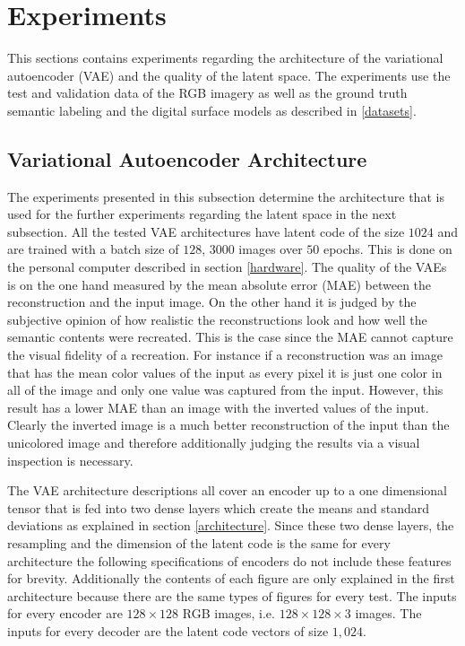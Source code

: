\section{Experiments}

This sections contains experiments regarding the architecture of the variational autoencoder (VAE)
and the quality of the latent space. The experiments use the test and validation data of the RGB
imagery as well as the ground truth semantic labeling and the digital surface models as described in
\ref{datasets}.

\subsection{Variational Autoencoder Architecture} \label{architecture_experiments}

The experiments presented in this subsection determine the architecture that is used for the further
experiments regarding the latent space in the next subsection. All the tested VAE architectures have 
latent code of the size $1024$ and are trained with a batch size of $128$, $3000$ images over $50$ epochs.
This is done on the personal computer described in section \ref{hardware}.
The quality of the VAEs is on the one hand measured by the mean absolute error (MAE)
between the reconstruction and the input image.
On the other hand it is judged by the subjective opinion of how realistic the reconstructions look and how well
the semantic contents were recreated. This is the case since the MAE 
cannot capture the visual fidelity of a recreation. For instance if a reconstruction was an image that has the mean
color values of the input as every pixel it is just one color in all of the image and only one value was captured
from the input. However, this result has a lower MAE than an image with the inverted values of the
input. Clearly the inverted image is a much better reconstruction of the input than the unicolored image and therefore
additionally judging the results via a visual inspection is necessary.

The VAE architecture descriptions all cover an encoder up to a one dimensional tensor that is fed into two dense
layers which create the means and standard deviations as explained in section \ref{architecture}. Since these two
dense layers, the resampling and the dimension of the latent code is the same for every architecture the following
specifications of encoders do not include these features for brevity. Additionally the contents of
each figure are only explained in the first architecture because there are the same types of figures for
every test. 
The inputs for every encoder are $128\times 128$ RGB images, i.e. $128\times 128\times 3$ images. The inputs
for every decoder are the latent code vectors of size $1,024$.


